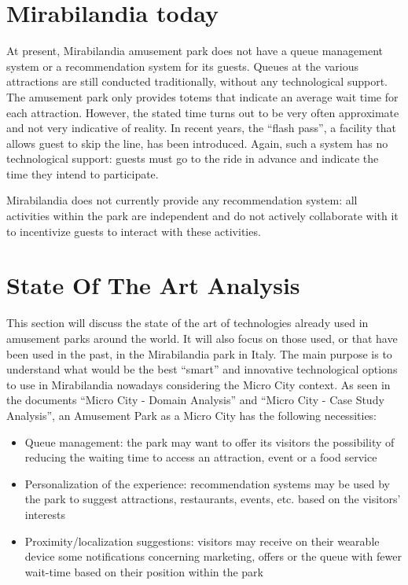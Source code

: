 \section{Mirabilandia today}\label{sec:mirabilandia-today}
At present, Mirabilandia amusement park does not have a queue management system or a recommendation system for its guests.
Queues at the various attractions are still conducted traditionally, without any technological support.
The amusement park only provides totems that indicate an average wait time for each attraction.
However, the stated time turns out to be very often approximate and not very indicative of reality.
In recent years, the ``flash pass'', a facility that allows guest to skip the line, has been introduced.
Again, such a system has no technological support: guests must go to the ride in advance and indicate the time they intend to participate.

Mirabilandia does not currently provide any recommendation system: all activities within the park are independent and do not actively collaborate
with it to incentivize guests to interact with these activities.

\section{State Of The Art Analysis}\label{sec:state-of-the-art-analysis}
This section will discuss the state of the art of technologies already used in amusement parks around the world.
It will also focus on those used, or that have been used in the past, in the Mirabilandia park in Italy.
The main purpose is to understand what would be the best ``smart'' and innovative technological options to use in Mirabilandia nowadays considering the Micro City context.
As seen in the documents ``Micro City - Domain Analysis'' and ``Micro City - Case Study Analysis'', an Amusement Park as a Micro City has the following necessities:
\begin{itemize}
    \item Queue management: the park may want to offer its visitors the possibility of reducing the waiting time to access an attraction, event or a food service
    \item Personalization of the experience: recommendation systems may be used by the park to suggest attractions, restaurants, events, etc.
    based on the visitors' interests
    \item Proximity/localization suggestions: visitors may receive on their wearable device some notifications concerning marketing, offers or the queue with fewer wait-time based on their position within the park
\end{itemize}

